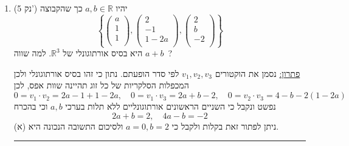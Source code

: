 \documentclass[12pt, a4paper]{article}
\newcommand{\rr}{\mathbb{R}}
\newcommand{\points}[1]{(#1 נק') }
\begin{document}
\begin{enumerate}
\item\points{5}
יהיו
$a,b\in\rr$
כך שהקבוצה
$$\left\{
\begin{pmatrix}
a\\1\\1\\
\end{pmatrix},
\begin{pmatrix}
2\\-1\\1-2a\\
\end{pmatrix},
\begin{pmatrix}
2\\b\\-2\\
\end{pmatrix}
\right\}$$
היא בסיס אורתוגונלי של
$\rr^3$.
למה שווה
$a+b$\ ?
\begin{enumerate}
\end{enumerate}

\underline{פתרון:}
נסמן את הוקטורים
$v_1,v_2,v_3$
לפי סדר הופעתם. נתון כי זהו בסיס אורתוגונלי ולכן המכפלות הסלקריות של כל זוג תהיינה שוות אפס, לכן
$$0=v_1\cdot v_2=2a-1+1-2a,\quad 0=v_1\cdot v_3=2a+b-2,\quad 0=v_2\cdot v_3=4-b-2(1-2a)$$
נפשט ונקבל כי השניים הראשונים אורתוגונליים ללא תלות בערכי $a,b$
וכי בהכרח
$$2a+b=2,\quad 4a-b=-2$$
ניתן לפתור זאת בקלות ולקבל כי
$a=0,b=2$
ולסיכום התשובה הנכונה היא (א).

\noindent\rule{16cm}{0.4pt}

\newpage



\end{enumerate}
\end{document}
